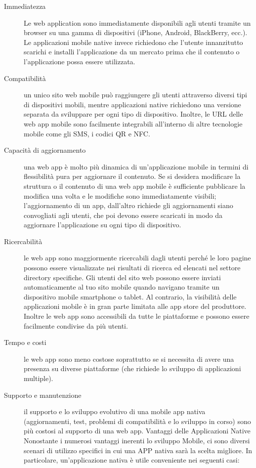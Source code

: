 \begin{description}

\item[Immediatezza]Le web application sono immediatamente disponibili agli utenti tramite un browser su una gamma di dispositivi (iPhone, Android, BlackBerry, ecc.). Le applicazioni mobile native invece richiedono che l'utente innanzitutto scarichi e installi l'applicazione da un mercato prima che il contenuto o l'applicazione possa essere utilizzata.
\item[Compatibilità] un unico sito web mobile può raggiungere gli utenti attraverso diversi tipi di dispositivi mobili, mentre applicazioni native richiedono una versione separata da sviluppare per ogni tipo di dispositivo. Inoltre, le URL delle web app mobile sono facilmente integrabili all'interno di altre tecnologie mobile come gli SMS, i codici QR e NFC.
\item[Capacità di aggiornamento] una web app è molto più dinamica di un'applicazione mobile in termini di flessibilità pura per aggiornare il contenuto. Se si desidera modificare la struttura o il contenuto di una web app mobile è sufficiente pubblicare la modifica una volta e le modifiche sono immediatamente visibili; l'aggiornamento di un app, dall'altro richiede gli aggiornamenti siano convogliati agli utenti, che poi devono essere scaricati in modo da aggiornare l'applicazione su ogni tipo di dispositivo.
\item[Ricercabilità] le web app sono maggiormente ricercabili dagli utenti perché le loro pagine possono essere visualizzate nei risultati di ricerca ed elencati nel settore directory specifiche. Gli utenti del sito web possono essere inviati automaticamente al tuo sito mobile quando navigano tramite un dispositivo mobile smartphone o tablet. Al contrario, la visibilità delle applicazioni mobile è in gran parte limitata alle app store del produttore.  Inoltre le web app sono accessibili da tutte le piattaforme e possono essere facilmente condivise da più utenti. 
\item[Tempo e costi] le web app sono meno costose  soprattutto se si necessita di avere una presenza su diverse piattaforme (che richiede lo sviluppo di applicazioni multiple).
\item[Supporto e manutenzione] il supporto e lo sviluppo evolutivo  di una mobile  app nativa (aggiornamenti, test, problemi di compatibilità e lo sviluppo in corso) sono più costosi al supporto di una web app. Vantaggi delle Applicazioni Native Nonostante i numerosi vantaggi inerenti lo sviluppo Mobile, ci sono diversi scenari di utilizzo specifici in cui una APP nativa sarà la scelta migliore. In particolare, un'applicazione nativa è utile conveniente nei seguenti casi:

\end{description}
